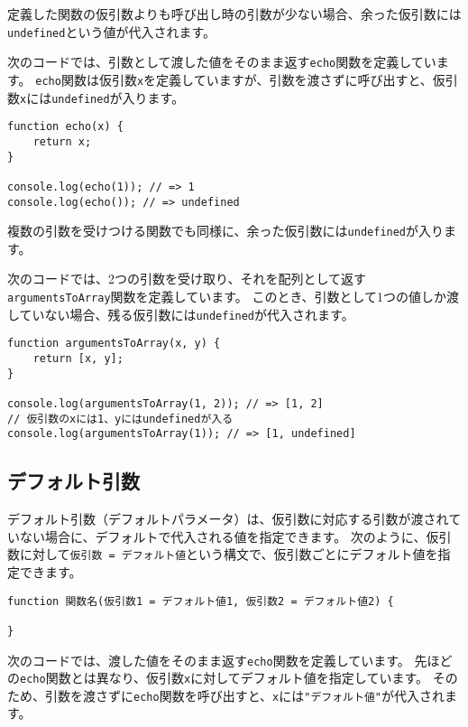 定義した関数の仮引数よりも呼び出し時の引数が少ない場合、余った仮引数には\texttt{undefined}という値が代入されます。

次のコードでは、引数として渡した値をそのまま返す\texttt{echo}関数を定義しています。
\texttt{echo}関数は仮引数\texttt{x}を定義していますが、引数を渡さずに呼び出すと、仮引数\texttt{x}には\texttt{undefined}が入ります。

\begin{lstlisting}
function echo(x) {
    return x;
}

console.log(echo(1)); // => 1
console.log(echo()); // => undefined
\end{lstlisting}

複数の引数を受けつける関数でも同様に、余った仮引数には\texttt{undefined}が入ります。

次のコードでは、2つの引数を受け取り、それを配列として返す\texttt{argumentsToArray}関数を定義しています。
このとき、引数として1つの値しか渡していない場合、残る仮引数には\texttt{undefined}が代入されます。

\begin{lstlisting}
function argumentsToArray(x, y) {
    return [x, y];
}

console.log(argumentsToArray(1, 2)); // => [1, 2]
// 仮引数のxには1、yにはundefinedが入る
console.log(argumentsToArray(1)); // => [1, undefined]
\end{lstlisting}

\hypertarget{function-default-parameters}{%
\subsection{デフォルト引数\protect{}}\label{function-default-parameters}}

デフォルト引数（デフォルトパラメータ）は、仮引数に対応する引数が渡されていない場合に、デフォルトで代入される値を指定できます。
次のように、仮引数に対して\texttt{仮引数 = デフォルト値}という構文で、仮引数ごとにデフォルト値を指定できます。

\begin{lstlisting}
function 関数名(仮引数1 = デフォルト値1, 仮引数2 = デフォルト値2) {

}
\end{lstlisting}

次のコードでは、渡した値をそのまま返す\texttt{echo}関数を定義しています。
先ほどの\texttt{echo}関数とは異なり、仮引数\texttt{x}に対してデフォルト値を指定しています。
そのため、引数を渡さずに\texttt{echo}関数を呼び出すと、\texttt{x}には\texttt{"デフォルト値"}が代入されます。

